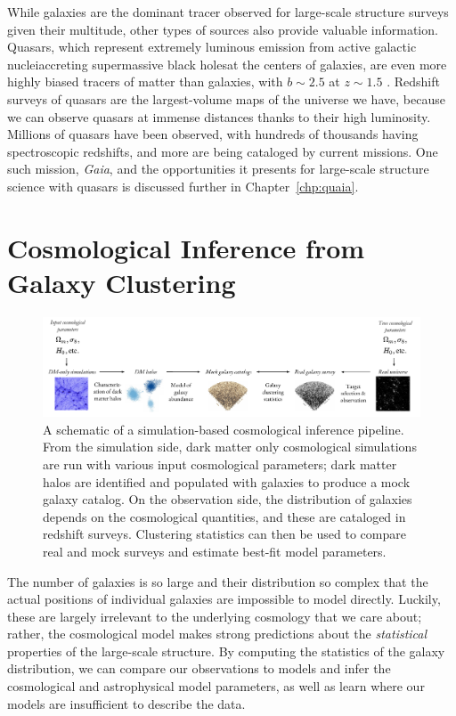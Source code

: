 While galaxies are the dominant tracer observed for large-scale structure surveys given their multitude, other types of sources also provide valuable information.
Quasars, which represent extremely luminous emission from active galactic nuclei{\emdash}accreting supermassive black holes{\emdash}at the centers of galaxies, are even more highly biased tracers of matter than galaxies, with $b \sim 2.5$ at $z \sim 1.5$ \citep{laurent_clustering_2017-3}.
Redshift surveys of quasars are the largest-volume maps of the universe we have, because we can observe quasars at immense distances thanks to their high luminosity.
Millions of quasars have been observed, with hundreds of thousands having spectroscopic redshifts, and more are being cataloged by current missions.
One such mission, \emph{Gaia}, and the opportunities it presents for large-scale structure science with quasars is discussed further in Chapter~\ref{chp:quaia}.



\section{Cosmological Inference from Galaxy Clustering}

\begin{figure}
    \centering
    \includegraphics[width=\textwidth]{cosmo_inference.pdf}
    \caption{A schematic of a simulation-based cosmological inference pipeline. From the simulation side, dark matter only cosmological simulations are run with various input cosmological parameters; dark matter halos are identified and populated with galaxies to produce a mock galaxy catalog. On the observation side, the distribution of galaxies depends on the cosmological quantities, and these are cataloged in redshift surveys. Clustering statistics can then be used to compare real and mock surveys and estimate best-fit model parameters.}
    \label{fig:cosmo_inf}
\end{figure}

The number of galaxies is so large and their distribution so complex that the actual positions of individual galaxies are impossible to model directly.
Luckily, these are largely irrelevant to the underlying cosmology that we care about; rather, the cosmological model makes strong predictions about the \emph{statistical} properties of the large-scale structure.
By computing the statistics of the galaxy distribution, we can compare our observations to models and infer the cosmological and astrophysical model parameters, as well as learn where our models are insufficient to describe the data.

